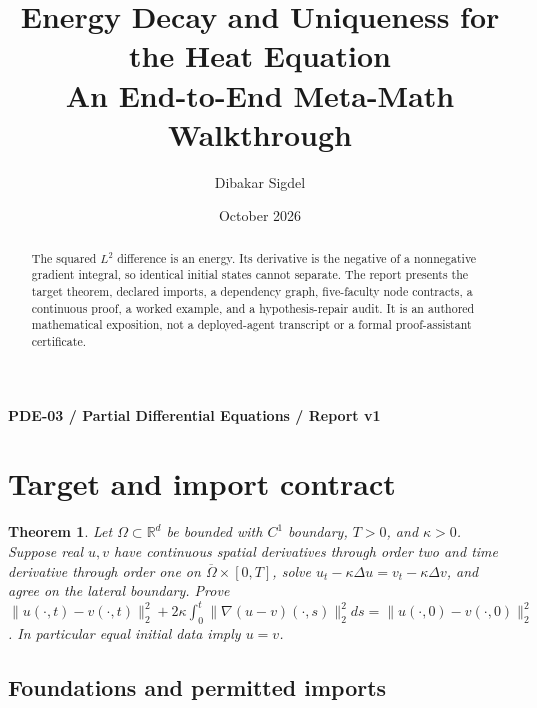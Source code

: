 \documentclass[preprint,12pt,aps,pra,showkeys,amsmath,amssymb,superscriptaddress,floatfix]{revtex4-2}
\newtheorem{theorem}{Theorem}[section]
\theoremstyle{definition}
\theoremstyle{remark}
\begin{document}
\title{Energy Decay and Uniqueness for the Heat Equation\\[4pt]\large An End-to-End Meta-Math Walkthrough}

\author{Dibakar Sigdel}


\date{October 2026}

\begin{abstract}

The squared \(L^2\) difference is an energy. Its derivative is the
negative of a nonnegative gradient integral, so identical initial states
cannot separate. The report presents the target theorem, declared
imports, a dependency graph, five-faculty node contracts, a continuous
proof, a worked example, and a hypothesis-repair audit. It is an
authored mathematical exposition, not a deployed-agent transcript or a
formal proof-assistant certificate.

\end{abstract}\maketitle\linespread{1.12}\selectfont

\noindent\textbf{PDE-03 / Partial Differential Equations / Report v1}

\section{Target and import contract}

\begin{theorem}

Let \(\Omega\subset\mathbb R^d\) be bounded with \(C^1\) boundary,
\(T>0\), and \(\kappa>0\). Suppose real \(u,v\) have continuous spatial
derivatives through order two and time derivative through order one on
\(\overline\Omega\times[0,T]\), solve
\(u_t-\kappa\Delta u=v_t-\kappa\Delta v\), and agree on the lateral
boundary. Prove
\(\|u(\cdot,t)-v(\cdot,t)\|_2^2+2\kappa\int_0^t\|\nabla(u-v)(\cdot,s)\|_2^2ds=\|u(\cdot,0)-v(\cdot,0)\|_2^2\).
In particular equal initial data imply \(u=v\).

\end{theorem}

\subsection{Foundations and permitted imports}
\end{document}
